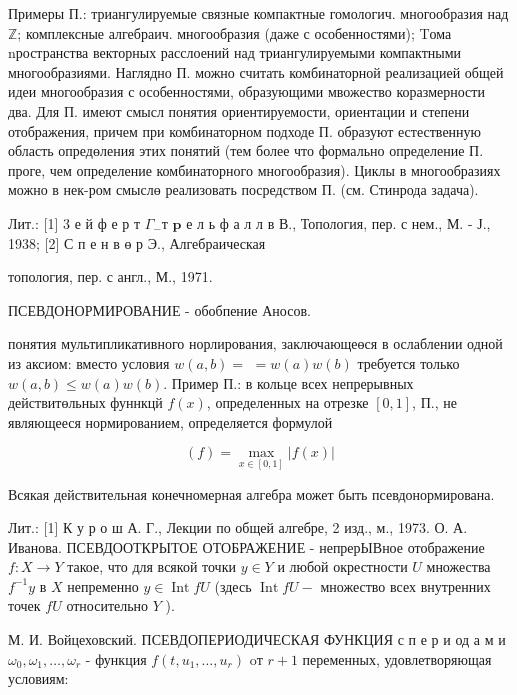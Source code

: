\documentclass[10pt]{article}
\begin{document}
Примеры П.: триангулируемые связные компактные гомологич. многообразия над $\mathbb{Z}$; комплексные алгебраич. многообразия (даже с особенностями); Tома nространства векторных расслоений над триангулируемыми компактными многообразиями. Наглядно П. можно считать комбинаторной реализацией общей идеи многообразия с особенностями, образующими мвожество коразмерности два. Для П. имеют смысл понятия ориентируемости, ориентации и степени отображения, причем при комбинаторном подходе П. образуют естественную область опредөления этих понятий (тем более что формально определение П. проге, чем определение комбинаторного многообразия). Циклы в многообразиях можно в нек-ром смыслө реализовать посредством П. (см. Стинрода задача).



Лит.: [1] 3 е й ф е р т $\Gamma_{-}$т $\mathbf{p}$ е л ь ф а л л в В., Топология, пер. с нем., М. - Ј., 1938; [2] С п е н в ө р Э., Алгебраическая

топология, пер. с англ., М., 1971.

ПСЕВДОНОРМИРОВАНИЕ - обобпение Аносов.

понятия мультипликативного норлирования, заключающеөся в ослаблении одной из аксиом: вместо условия $w(a, b)=$ $=w(a) w(b)$ требуется только $w(a, b) \leqslant w(a) w(b)$. Пример П.: в кольце всех непрерывных действитөльных фуннкцй $f(x)$, определенных на отрезке $[0,1]$, П., не являющееся нормированием, определяется формулой



\[

(f)=\max _{x \in[0,1]}|f(x)|

\]



Всякая действительная конечномерная алгебра может быть псевдонормирована.



Лит.: [1] К у р о ш А. Г., Лекции по общей алгебре, 2 изд., м., 1973. О. А. Иванова. ПСЕВДООТКРЫТОЕ ОТОБРАЖЕНИЕ - непрерЫВное отображение $f: X \rightarrow Y$ такое, что для всякой точки $y \in Y$ и любой окрестности $U$ множества $f^{-1} y$ в $X$ непременно $y \in \operatorname{Int} f U$ (здесь $\operatorname{Int} f U-$ множество всех внутренних точек $f U$ относительно $Y$ ).



М. И. Войцеховский. ПСЕВДОПЕРИОДИЧЕСКАЯ ФУНКЦИЯ с п е р и од а м и $\omega_{0}, \omega_{1}, \ldots, \omega_{r}$ - функция $f\left(t, u_{1}, \ldots, u_{r}\right)$ oт $r+1$ переменных, удовлетворяющая условиям:
\end{document}

